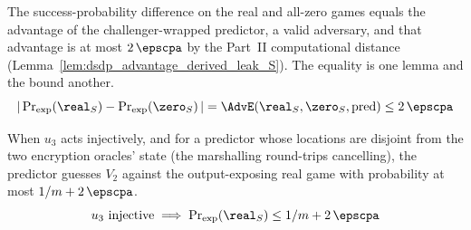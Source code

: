 \begin{lemma}
  \label{lem:guess_advantage_le}
  \rocqok
  The success-probability difference on the real and all-zero games equals the
  advantage of the challenger-wrapped predictor, a valid adversary, and that
  advantage is at most $2\,\epscpa$ by the Part~II computational distance
  (Lemma~\ref{lem:dsdp_advantage_derived_leak_S}). The equality is one lemma and
  the bound another.
  \[ \lvert\,\Prexp(\real_S) - \Prexp(\zero_S)\,\rvert
        = \AdvE(\real_S, \zero_S, \text{pred}) \le 2\,\epscpa \]
\end{lemma}

\begin{theorem}
  \label{thm:dsdp_alice_secrecy_leak_S}
  \rocqok
  When $u_3$ acts injectively, and for a predictor whose locations are disjoint
  from the two encryption oracles' state (the marshalling round-trips cancelling),
  the predictor guesses $V_2$ against the output-exposing real game with
  probability at most $1/m + 2\,\epscpa$.
  \[ u_3 \text{ injective} \;\Longrightarrow\; \Prexp(\real_S) \le 1/m + 2\,\epscpa \]
\end{theorem}
